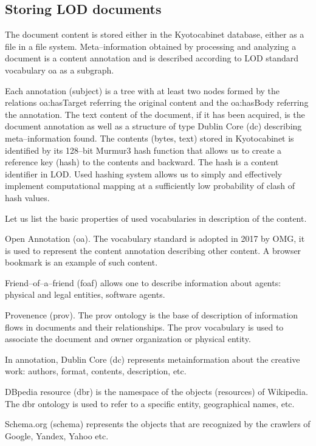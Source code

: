 \documentclass[12pt]{llncs}
\begin{document}
\subsection{Storing LOD documents}

The document content is stored either in the Kyotocabinet database,
either as a file in a file system. Meta--information obtained by
processing and analyzing a document is a content annotation and is
described according to LOD standard vocabulary oa as a subgraph.

Each annotation (subject) is a tree with at least two nodes formed by
the relations oa:hasTarget referring the original content and the
oa:hasBody referring the annotation. The text content of the document,
if it has been acquired, is the document annotation as well as a
structure of type Dublin Core (dc) describing meta--information found.
The contents (bytes, text) stored in Kyotocabinet is identified by its
128--bit Murmur3 hash function that allows us to create a reference key
(hash) to the contents and backward. The hash is a content identifier in
LOD. Used hashing system allows us to simply and effectively implement
computational mapping at a sufficiently low probability of clash of hash
values.

Let us list the basic properties of used vocabularies in description of
the content.

Open Annotation (oa). The vocabulary standard is adopted in 2017 by OMG, it is
used to represent the content annotation describing other content. A
browser bookmark is an example of such content.

Friend--of--a--friend (foaf) allows one to describe information about
agents: physical and legal entities, software agents.

Provenence (prov). The prov ontology is the base of description of
information flows in documents and their relationships. The prov
vocabulary is used to associate the document and owner organization or
physical entity.

In annotation, Dublin Core (dc) represents metainformation about the
creative work: authors, format, contents, description, etc.

DBpedia resource (dbr) is the namespace of the objects (resources) of
Wikipedia. The dbr ontology is used to refer to a specific entity,
geographical names, etc.

Schema.org (schema) represents the objects that are recognized by the
crawlers of Google, Yandex, Yahoo etc.
\end{document}
